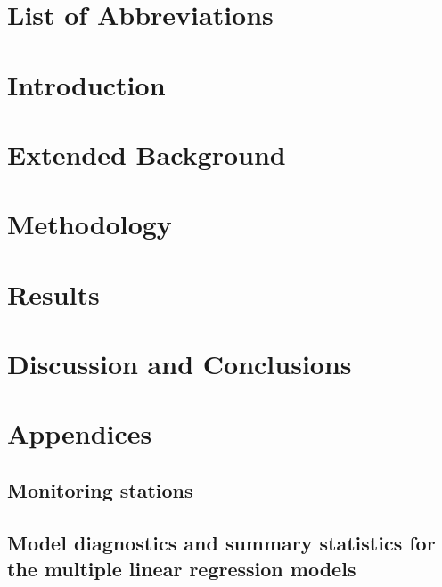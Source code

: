 \documentclass[12pt]{report}
\numberwithin{equation}{section}
\begin{document}
\listoftables
\thispagestyle{plain}

\chapter*{List of Abbreviations}


\chapter{Introduction}
\setcounter{page}{1}


\chapter{Extended Background}


\chapter{Methodology}


\chapter{Results}


\chapter{Discussion and Conclusions}


{}

%

%
\chapter*{Appendices}
\setcounter{section}{0}
\renewcommand\thesection{\Alph{section}}

\section{Monitoring stations}

\section{Model diagnostics and summary statistics for the multiple linear regression models}

\end{document}
